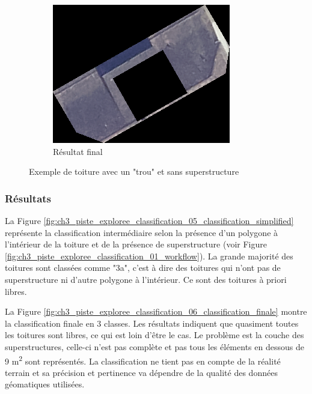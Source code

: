 \begin{figure}[H]
    \vspace{0.35cm} %
    
    \begin{subfigure}[b]{0.48\textwidth}
        \centering
        \includegraphics[width=\textwidth]{02-main/figures/ch3_piste_exploree_classification_04_image_resultante.png}
        \caption{Résultat final}
        \label{fig:ch3_piste_exploree_classification_04_image_resultante}
    \end{subfigure}

    \caption{Exemple de toiture avec un "trou" et sans superstructure}
    \label{fig:piste_exploree_classification_image_exemple}
\end{figure}

\subsubsection{Résultats}

La Figure \ref{fig:ch3_piste_exploree_classification_05_classification_simplified} représente la classification intermédiaire selon la présence d'un polygone à l'intérieur de la toiture et de la présence de superstructure (voir Figure \ref{fig:ch3_piste_exploree_classification_01_workflow}). La grande majorité des toitures sont classées comme "3a", c'est à dire des toitures qui n'ont pas de superstructure ni d'autre polygone à l'intérieur. Ce sont des toitures à priori libres.

La Figure \ref{fig:ch3_piste_exploree_classification_06_classification_finale} montre la classification finale en 3 classes. Les résultats indiquent que quasiment toutes les toitures sont libres, ce qui est loin d'être le cas. Le problème est la couche des superstructures, celle-ci n'est pas complète et pas tous les éléments en dessous de 9 \si{\unit{\square\meter}} sont représentés. La classification ne tient pas en compte de la réalité terrain et sa précision et pertinence va dépendre de la qualité des données géomatiques utilisées.


